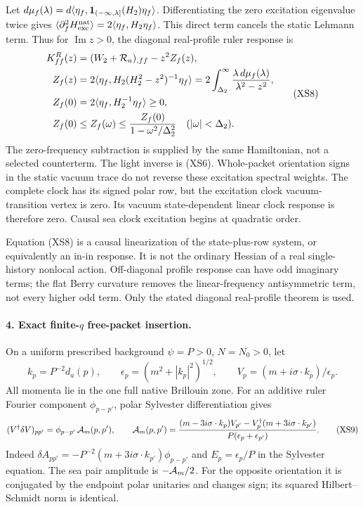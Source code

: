 \documentclass[11pt]{article}
\begin{document}
Let $d\mu_f(\lambda)=d\langle\eta_f,
{\bf1}_{(-\infty,\lambda]}(H_2)\eta_f\rangle$.
Differentiating the zero excitation eigenvalue twice gives
$\langle\partial_f^2H_{\rm exc}^{\rm nat}\rangle
=2\langle\eta_f,H_2\eta_f\rangle$.
This direct term cancels the static Lehmann term.  Thus for
$\operatorname{Im}z>0$, the diagonal real-profile ruler response is
\begin{equation}
 \begin{aligned}
 K^R_{ff}(z)
  &=(W_2+{\cal R}_a)_{,ff}-z^2 Z_f(z),\\
 Z_f(z)
  &=2\langle\eta_f,H_2(H_2^2-z^2)^{-1}\eta_f\rangle
    =2\int_{\Delta_2}^{\infty}
             \frac{\lambda\,d\mu_f(\lambda)}{\lambda^2-z^2},\\
 Z_f(0)&=2\langle\eta_f,H_2^{-1}\eta_f\rangle\geq0,\\
 Z_f(0)&\leq Z_f(\omega)
 \leq\frac{Z_f(0)}{1-\omega^2/\Delta_2^2}
                       \quad(|\omega|<\Delta_2).
 \end{aligned}\tag{XS8}
\end{equation}
The zero-frequency subtraction is supplied by the same
Hamiltonian, not a selected counterterm.  The light inverse
is (XS6).  Whole-packet orientation signs in the static
vacuum trace do not reverse these excitation spectral weights.
The complete clock has its signed polar row, but the
excitation clock vacuum-transition vertex is zero.
Its vacuum state-dependent linear clock response is therefore
zero.  Causal sea clock excitation begins at quadratic order.

Equation (XS8) is a causal linearization of the state-plus-row
system, or equivalently an in-in response.  It is not the
ordinary Hessian of a real single-history nonlocal action.
Off-diagonal profile response can have odd imaginary terms;
the flat Berry curvature removes the linear-frequency
antisymmetric term, not every higher odd term.
Only the stated diagonal real-profile theorem is used.

\paragraph{4. Exact finite-$q$ free-packet insertion.}
On a uniform prescribed background $\psi=P>0$, $N=N_0>0$,
let
\[
 k_p=P^{-2}d_a(p),\qquad
 \epsilon_p=(m^2+|k_p|^2)^{1/2},\qquad
 V_p=(m+i\sigma\cdot k_p)/\epsilon_p .
\]
All momenta lie in the one full native Brillouin zone.
For an additive ruler Fourier component $\phi_{p-p'}$,
polar Sylvester differentiation gives
\begin{equation}
 (V^\dagger\delta V)_{pp'}
       =\phi_{p-p'}\,{\cal A}_m(p,p'),\qquad
 {\cal A}_m(p,p')
 =\frac{(m-3i\sigma\cdot k_p)V_{p'}
       -V_p^\dagger(m+3i\sigma\cdot k_{p'})}
             {P(\epsilon_p+\epsilon_{p'})}.
 \tag{XS9}
\end{equation}
Indeed $\delta A_{pp'}=-P^{-2}(m+3i\sigma\cdot k_{p'})
\phi_{p-p'}$ and $E_p=\epsilon_p/P$ in the Sylvester equation.
The sea pair amplitude is $-{\cal A}_m/2$.
For the opposite orientation it is conjugated by the
endpoint polar unitaries and changes sign; its squared
Hilbert--Schmidt norm is identical.
\end{document}
